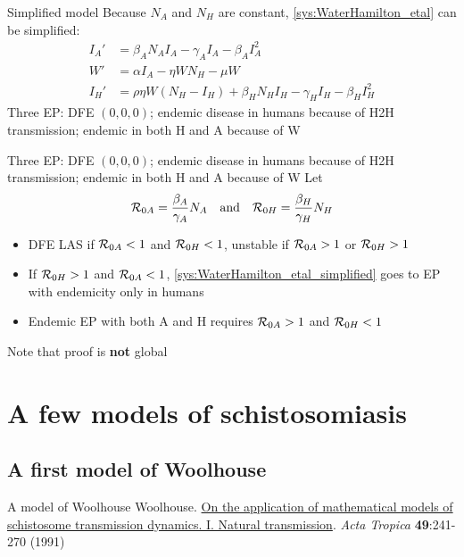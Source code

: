 \documentclass[aspectratio=169]{beamer}
\begin{document}
\begin{frame}{Simplified model}
  Because $N_A$ and $N_H$ are constant, \eqref{sys:WaterHamilton_etal} can be simplified:
  \begin{subequations}
    \label{sys:WaterHamilton_etal_simplified}
    \begin{align}
      I_A' &= \beta_AN_AI_A-\gamma_AI_A-\beta_AI_A^2 \\
      W' &= \alpha I_A-\eta WN_H-\mu W \\
      I_H' &= \rho\eta W(N_H-I_H)+\beta_HN_HI_H-\gamma_HI_H-\beta_HI_H^2 
    \end{align}
  \end{subequations}
  \vfill
  Three EP: DFE $(0,0,0)$; endemic disease in humans because of H2H transmission; endemic in both H and A because of W
\end{frame}


\begin{frame}
  Three EP: DFE $(0,0,0)$; endemic disease in humans because of H2H transmission; endemic in both H and A because of W
  \vfill
  Let
  \begin{equation}
    \mathcal{R}_{0A} = \frac{\beta_A}{\gamma_A}N_A\quad\text{and}\quad
    \mathcal{R}_{0H} = \frac{\beta_H}{\gamma_H}N_H
  \end{equation}
  \vfill
  \begin{itemize}
    \item DFE LAS if $\mathcal{R}_{0A}<1$ and $\mathcal{R}_{0H}<1$, unstable if $\mathcal{R}_{0A}>1$ or $\mathcal{R}_{0H}>1$
    \item If $\mathcal{R}_{0H}>1$ and $\mathcal{R}_{0A}<1$, \eqref{sys:WaterHamilton_etal_simplified} goes to EP with endemicity only in humans
    \item Endemic EP with both A and H requires $\mathcal{R}_{0A}>1$ and $\mathcal{R}_{0H}<1$
  \end{itemize}
  Note that proof is \textbf{not} global
\end{frame}


\section{A few models of schistosomiasis}

\subsection{A first model of Woolhouse}
\begin{frame}{A model of Woolhouse}
  Woolhouse. \href{}{On the application of mathematical models of schistosome transmission dynamics. I. Natural transmission}. \emph{Acta Tropica} \textbf{49}:241-270 (1991)
\end{frame}
\end{document}
